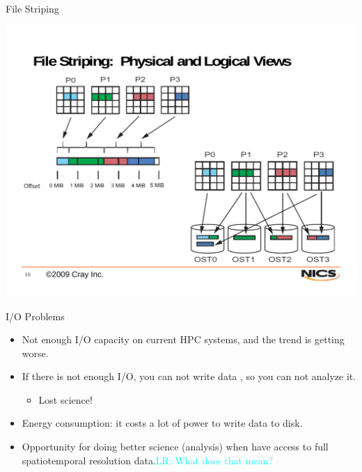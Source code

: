 \documentclass[compress,11pt,xcolor=svgnames,aspectratio=169]{beamer}
\newcommand{\lr}[1]{\textcolor{cyan}{LR: #1}}
\begin{document}
\begin{frame}[fragile]{File Striping}

\vspace*{-0.7cm}

\begin{center}
\includegraphics[scale=0.35]{fig/file-striping}
\end{center}

\nocite{PIOTAPO12}

\end{frame}

\begin{frame}[fragile]{I/O Problems}

\begin{itemize}
\setlength\itemsep{0.7cm}

\item Not enough I/O capacity on current HPC systems, and the trend is getting worse.

\item If there is not enough I/O, you can not write data%
, so you can not analyze it.
    \begin{itemize}
        \item Lost science!
    \end{itemize}

\item Energy consumption: it costs a lot of power to write data to disk.

\item Opportunity for doing better science (analysis) when have access to full spatiotemporal resolution data.\lr{What does that mean?}

\end{itemize}

\nocite{sensei-sc17}

\end{frame}
\end{document}
